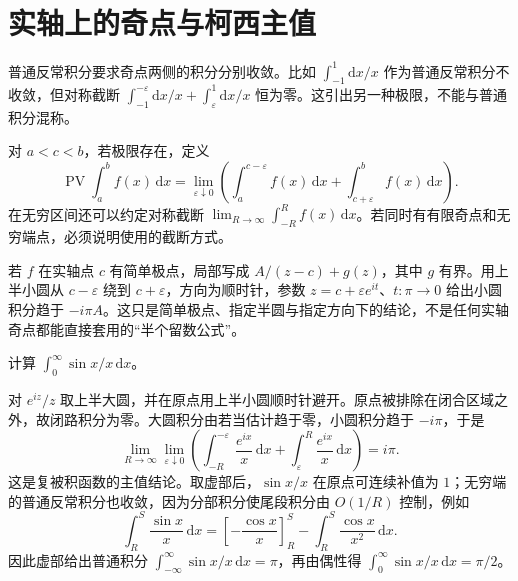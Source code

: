 \documentclass[UTF8,12pt,a4paper,fontset=fandol]{ctexbook}
\begin{document}
\section{实轴上的奇点与柯西主值}

普通反常积分要求奇点两侧的积分分别收敛。比如 $\int_{-1}^1\mathrm dx/x$ 作为普通反常积分不收敛，但对称截断 $\int_{-1}^{-\varepsilon}\mathrm dx/x+\int_\varepsilon^1\mathrm dx/x$ 恒为零。这引出另一种极限，不能与普通积分混称。

\begin{definition}[柯西主值]
对 $a<c<b$，若极限存在，定义
\[
 \operatorname{PV}\int_a^b f(x)\,\mathrm dx
 =\lim_{\varepsilon\downarrow0}
 \left(\int_a^{c-\varepsilon}f(x)\,\mathrm dx
 +\int_{c+\varepsilon}^bf(x)\,\mathrm dx\right).
\]
在无穷区间还可以约定对称截断 $\lim_{R\to\infty}\int_{-R}^Rf(x)\,\mathrm dx$。若同时有有限奇点和无穷端点，必须说明使用的截断方式。
\end{definition}

若 $f$ 在实轴点 $c$ 有简单极点，局部写成 $A/(z-c)+g(z)$，其中 $g$ 有界。用上半小圆从 $c-\varepsilon$ 绕到 $c+\varepsilon$，方向为顺时针，参数 $z=c+\varepsilon e^{it}$、$t:\pi\to0$ 给出小圆积分趋于 $-i\pi A$。这只是简单极点、指定半圆与指定方向下的结论，不是任何实轴奇点都能直接套用的“半个留数公式”。

\begin{example}[狄利克雷积分]
\label{ex:cv-dirichlet}
计算 $\int_0^\infty\sin x/x\,\mathrm dx$。
\end{example}
\begin{solve}
对 $e^{iz}/z$ 取上半大圆，并在原点用上半小圆顺时针避开。原点被排除在闭合区域之外，故闭路积分为零。大圆积分由若当估计趋于零，小圆积分趋于 $-i\pi$，于是
\[
 \lim_{R\to\infty}\lim_{\varepsilon\downarrow0}
 \left(\int_{-R}^{-\varepsilon}\frac{e^{ix}}x\,\mathrm dx
 +\int_\varepsilon^R\frac{e^{ix}}x\,\mathrm dx\right)=i\pi.
\]
这是复被积函数的主值结论。取虚部后，$\sin x/x$ 在原点可连续补值为 $1$；无穷端的普通反常积分也收敛，因为分部积分使尾段积分由 $O(1/R)$ 控制，例如
\[
 \int_R^S\frac{\sin x}{x}\,\mathrm dx
 =\left[-\frac{\cos x}{x}\right]_R^S
 -\int_R^S\frac{\cos x}{x^2}\,\mathrm dx.
\]
因此虚部给出普通积分 $\int_{-\infty}^{\infty}\sin x/x\,\mathrm dx=\pi$，再由偶性得 $\int_0^\infty\sin x/x\,\mathrm dx=\pi/2$。
\end{solve}
\end{document}
